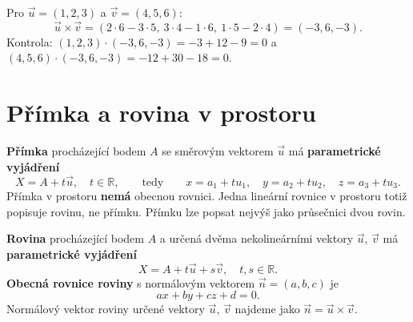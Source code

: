 \begin{example}
  Pro $\vec{u} = (1, 2, 3)$ a $\vec{v} = (4, 5, 6)$:
  \begin{equation*}
    \vec{u}\times\vec{v} = (2\cdot 6 - 3\cdot 5,\ 3\cdot 4 - 1\cdot 6,\ 1\cdot 5 - 2\cdot 4) = (-3, 6, -3).
  \end{equation*}
  Kontrola: $(1, 2, 3)\cdot(-3, 6, -3) = -3 + 12 - 9 = 0$ a $(4, 5, 6)\cdot(-3, 6, -3) = -12 + 30 - 18 = 0$.
\end{example}

\section{Přímka a rovina v prostoru}\label{sec:primka-rovina-prostor}

\begin{definitionbox}
  \textbf{Přímka} procházející bodem $A$ se směrovým vektorem $\vec{u}$ má \textbf{parametrické vyjádření}
  \begin{equation*}
    X = A + t\vec{u},\quad t\in\mathbb{R},\qquad\text{tedy}\qquad x = a_1 + tu_1,\quad y = a_2 + tu_2,\quad z = a_3 + tu_3.
  \end{equation*}
  Přímka v prostoru \textbf{nemá} obecnou rovnici. Jedna lineární rovnice v prostoru totiž popisuje rovinu, ne přímku. Přímku lze popsat nejvýš jako průsečnici dvou rovin.

  \vspace{0.2cm}

  \textbf{Rovina} procházející bodem $A$ a určená dvěma nekolineárními vektory $\vec{u}$, $\vec{v}$ má \textbf{parametrické vyjádření}
  \begin{equation*}
    X = A + t\vec{u} + s\vec{v},\quad t, s\in\mathbb{R}.
  \end{equation*}
  \textbf{Obecná rovnice roviny} s normálovým vektorem $\vec{n} = (a, b, c)$ je
  \begin{equation*}
    ax + by + cz + d = 0.
  \end{equation*}
  Normálový vektor roviny určené vektory $\vec{u}$, $\vec{v}$ najdeme jako $\vec{n} = \vec{u}\times\vec{v}$.
\end{definitionbox}


